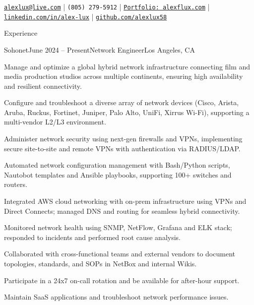 \documentclass[
	11pt
]{resume}
\begin{document}
\noindent
{\fontsize{8}{10}\selectfont
  \href{mailto:alexlux@live.com}{\texttt{alexlux@live.com}} \quad|\quad
  \texttt{(805)\,279-5912}           \quad|\quad
  \href{https://www.alexflux.com/}{\texttt{Portfolio: alexflux.com}} \quad|\quad
  \href{https://www.linkedin.com/in/alex-lux/}{\texttt{linkedin.com/in/alex-lux}} \quad|\quad
  \href{https://github.com/alexlux58}{\texttt{github.com/alexlux58}}
}

\begin{rSection}{Experience}

\begin{rSubsection}{Sohonet}{June 2024 -- Present}{Network Engineer}{Los Angeles, CA}
    \item Manage and optimize a global hybrid network infrastructure connecting film and media production studios across multiple continents, ensuring high availability and resilient connectivity.
    \item Configure and troubleshoot a diverse array of network devices (Cisco, Arista, Aruba, Ruckus, Fortinet, Juniper, Palo Alto, UniFi, Xirrus Wi-Fi), supporting a multi-vendor L2/L3 environment.
    \item Administer network security using next-gen firewalls and VPNs, implementing secure site-to-site and remote VPNs with authentication via RADIUS/LDAP.
    \item Automated network configuration management with Bash/Python scripts, Nautobot templates and Ansible playbooks, supporting 100+ switches and routers.
    \item Integrated AWS cloud networking with on-prem infrastructure using VPNs and Direct Connects; managed DNS and routing for seamless hybrid connectivity.
    \item Monitored network health using SNMP, NetFlow, Grafana and ELK stack; responded to incidents and performed root cause analysis.
    \item Collaborated with cross-functional teams and external vendors to document topologies, standards, and SOPs in NetBox and internal Wikis.
    \item Participate in a 24x7 on-call rotation and be available for after-hour support.
     \item Maintain SaaS applications and troubleshoot network performance issues.

\end{rSubsection}


\end{rSection}
\end{document}
